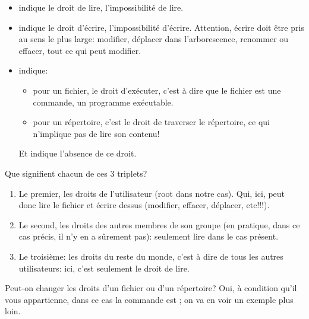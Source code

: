 \begin{itemize}
  \item {} indique le droit de lire, \ttt{-} l'impossibilité de
    lire.
  \item {} indique le droit d'écrire, \ttt{-} l'impossibilité
    d'écrire. Attention, écrire doit être pris au sens le plus large:
    modifier, déplacer dans l'arborescence, renommer ou effacer, tout
    ce qui peut modifier.
  \item {} indique:
    \begin{itemize}
      \item pour un fichier, le droit d'exécuter, c'est à dire que le
        fichier est une  commande, un programme exécutable.
      \item pour un répertoire, c'est le droit de traverser le
        répertoire, ce qui n'implique pas de lire son contenu!
    \end{itemize}
    Et \ttt{-} indique l'absence de ce droit.
\end{itemize}

Que signifient chacun de ces 3 triplets?

\begin{enumerate}
  \item Le premier, les droits de l'utilisateur (root dans notre
    cas). Qui, ici, peut 
    donc lire le fichier et écrire dessus (modifier, effacer,
    déplacer, etc!!!).
  \item Le second, les droits des autres membres de son groupe (en
    pratique, dans ce cas précis, il n'y en a sûrement pas): seulement
    lire dans le   cas présent.
  \item Le troisième: les droits du reste du monde, c'est à dire de
    tous les autres utilisateurs: ici, c'est seulement le droit de lire.
\end{enumerate}

Peut-on changer les droits d'un fichier ou d'un répertoire? Oui, à
condition qu'il vous appartienne, dans ce cas la commande est
; on va en voir un exemple plus loin.
